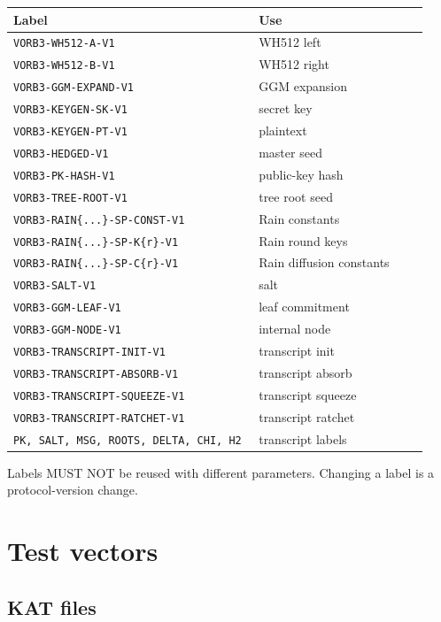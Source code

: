 \documentclass[11pt,a4paper]{article}
\begin{document}
\begin{longtable}{@{}p{0.55\linewidth}p{0.38\linewidth}@{}}
\toprule
Label & Use \\
\midrule
\endhead
\texttt{VORB3-WH512-A-V1} & WH512 left \\
\texttt{VORB3-WH512-B-V1} & WH512 right \\
\texttt{VORB3-GGM-EXPAND-V1} & GGM expansion \\
\texttt{VORB3-KEYGEN-SK-V1} & secret key \\
\texttt{VORB3-KEYGEN-PT-V1} & plaintext \\
\texttt{VORB3-HEDGED-V1} & master seed \\
\texttt{VORB3-PK-HASH-V1} & public-key hash \\
\texttt{VORB3-TREE-ROOT-V1} & tree root seed \\
\texttt{VORB3-RAIN\{...\}-SP-CONST-V1} & Rain constants \\
\texttt{VORB3-RAIN\{...\}-SP-K\{r\}-V1} & Rain round keys \\
\texttt{VORB3-RAIN\{...\}-SP-C\{r\}-V1} & Rain diffusion constants \\
\texttt{VORB3-SALT-V1} & salt \\
\texttt{VORB3-GGM-LEAF-V1} & leaf commitment \\
\texttt{VORB3-GGM-NODE-V1} & internal node \\
\texttt{VORB3-TRANSCRIPT-INIT-V1} & transcript init \\
\texttt{VORB3-TRANSCRIPT-ABSORB-V1} & transcript absorb \\
\texttt{VORB3-TRANSCRIPT-SQUEEZE-V1} & transcript squeeze \\
\texttt{VORB3-TRANSCRIPT-RATCHET-V1} & transcript ratchet \\
\texttt{PK, SALT, MSG, ROOTS, DELTA, CHI, H2} & transcript labels \\
\bottomrule
\end{longtable}

Labels MUST NOT be reused with different parameters. Changing a label is a
protocol-version change.

\section{Test vectors}

\subsection{KAT files}
\end{document}
